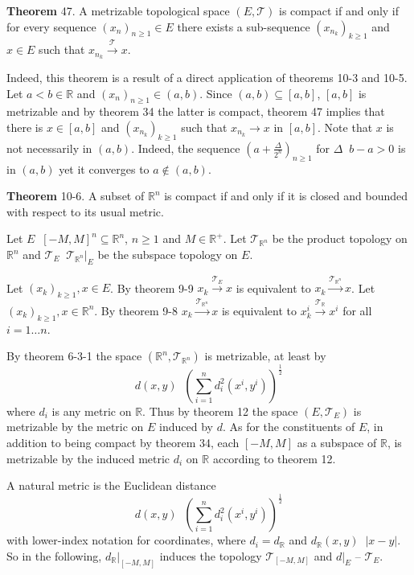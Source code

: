 \documentclass[a4paper]{article}
\newcommand{\clo}[1]{\left [ #1 \right ]}
\newcommand{\brac}[1]{\left ( #1 \right )}
\newcommand{\induc}[1]{\left . #1 \right \vert}
\newcommand{\abs}[1]{\left | #1 \right |}
\newcommand{\Real}{\mathbb{R}}
\newcommand{\Tcal}{\mathcal{T}}
\newcommand{\defn}{\mathop{\overset{\Delta}{=}}\nolimits}
\begin{document}
\label{thm:metric_compact} \noindent \textbf{Theorem} 47.
A metrizable topological space $\brac{E, \Tcal}$ is compact if and only if for every sequence $\brac{x_n}_{n\geq 1}\in E$ there exists a sub-sequence $\brac{x_{n_k}}_{k\geq 1}$ and $x\in E$ such that $x_{n_k}\overset{\Tcal}{\to} x$.

Indeed, this theorem is a result of a direct application of theorems 10-3 and 10-5.\\

Let $a<b\in \Real$ and $\brac{x_n}_{n\geq 1}\in \brac{a,b}$. Since $\brac{a,b}\subseteq \clo{a,b}$, $\clo{a,b}$ is metrizable and by theorem 34 the latter is compact, theorem 47 implies that there is $x\in \clo{a,b}$ and $\brac{x_{n_k}}_{k\geq 1}$ such that $x_{n_k}\to x$ in $\clo{a,b}$. Note that $x$ is not necessarily in $\brac{a,b}$. Indeed, the sequence $\brac{a+\frac{\Delta}{2^n}}_{n\geq 1}$ for $\Delta\defn b-a>0$ is in $\brac{a,b}$ yet it converges to $a\notin \brac{a,b}$.

\label{thm:realn_compact} \noindent \textbf{Theorem} 10-6.
A subset of $\Real^n$ is compact if and only if it is closed and bounded with respect to its usual metric.%

Let $E\defn \clo{-M, M}^n\subseteq \Real^n$, $n\geq 1$ and $M\in \Real^+$. Let $\Tcal_{\Real^n}$ be the product topology on $\Real^n$ and $\Tcal_E\defn \induc{\Tcal_{\Real^n}}_E$ be the subspace topology on $E$.

Let $\brac{x_k}_{k\geq 1}, x\in E$. By theorem 9-9 $x_k\overset{\Tcal_E}{\to} x$ is equivalent to $x_k\overset{\Tcal_{\Real^n}}{\to} x$. Let $\brac{x_k}_{k\geq 1}, x\in \Real^n$. By theorem 9-8 $x_k\overset{\Tcal_{\Real^n}}{\to} x$ is equivalent to $x_k^i\overset{\Tcal_{\Real}}{\to} x^i$ for all $i=1\ldots n$.

By theorem 6-3-1 the space $\brac{\Real^n, \Tcal_{\Real^n}}$ is metrizable, at least by \[d\brac{x,y}\defn \brac{\sum_{i=1}^n d_i^2\brac{x^i,y^i}}^\frac{1}{2}\] where $d_i$ is any metric on $\Real$. Thus by theorem 12 the space $\brac{E,\Tcal_E}$ is metrizable by the metric on $E$ induced by $d$. As for the constituents of $E$, in addition to being compact by theorem 34, each $\clo{-M, M}$ as a subspace of $\Real$, is metrizable by the induced metric $d_i$ on $\Real$ according to theorem 12.

A natural metric is the Euclidean distance \[d\brac{x,y}\defn \brac{\sum_{i=1}^n d_i^2\brac{x^i,y^i}}^\frac{1}{2}\] with lower-index notation for coordinates, where $d_i=d_\Real$ and $d_\Real\brac{x,y}\defn \abs{x-y}$. So in the following, $\induc{d_\Real}_{\clo{-M,M}}$ induces the topology $\Tcal_{\clo{-M,M}}$ and $\induc{d}_E$ -- $\Tcal_E$.
\end{document}

